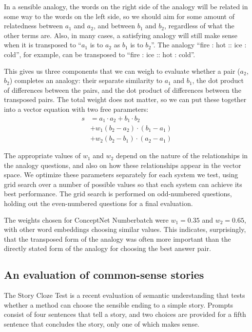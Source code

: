 \documentclass[letterpaper]{article}
\begin{document}
In a sensible analogy, the words on the right side of the analogy will be
related in some way to the words on the left side, so we should aim for some
amount of relatedness between $a_1$ and $a_2$, and between $b_1$ and $b_2$,
regardless of what the other terms are. Also, in many cases, a satisfying
analogy will still make sense when it is transposed to ``$a_1$ is to $a_2$ as
$b_1$ is to $b_2$''. The analogy ``fire : hot :: ice : cold'', for example, can
be transposed to ``fire : ice :: hot : cold''.

This gives us three components that we can weigh to evaluate whether a pair
($a_2$, $b_2$) completes an analogy: their separate similarity to $a_1$ and
$b_1$, the dot product of differences between the pairs, and the dot product of
differences between the transposed pairs.  The total weight does not matter, so
we can put these together into a vector equation with two free parameters:
\begin{equation}
    \begin{split}
        s &= a_1 \cdot a_2 + b_1 \cdot b_2\\
          &  + w_1(b_2 - a_2) \cdot (b_1 - a_1)\\
          &  + w_2(b_2 - b_1) \cdot (a_2 - a_1)
    \end{split}
\end{equation}

The appropriate values of $w_1$ and $w_2$ depend on the nature of the
relationships in the analogy questions, and also on how these relationships
appear in the vector space. We optimize these parameters separately for each
system we test, using grid search over a number of possible values so that each
system can achieve its best performance. The grid search is performed on
odd-numbered questions, holding out the even-numbered questions for a final
evaluation.

The weights chosen for ConceptNet Numberbatch were $w_1 = 0.35$ and $w_2 =
0.65$, with other word embeddings choosing similar values. This indicates,
surprisingly, that the transposed form of the analogy was often more important
than the directly stated form of the analogy for choosing the best answer pair.

\subsection{An evaluation of common-sense stories}
\label{story-evaluation}

The Story Cloze Test \cite{mostafazadeh2016cloze} is a recent evaluation of
semantic understanding that tests whether a method can choose the sensible
ending to a simple story. Prompts consist of four sentences that tell a story,
and two choices are provided for a fifth sentence that concludes the story,
only one of which makes sense.
\end{document}

